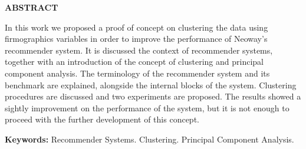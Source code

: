 \thispagestyle{plain}

\begin{center}
	\textbf{ABSTRACT}
\end{center}

\bigskip

In this work we proposed a proof of concept on clustering the data using firmographics variables in order to improve the performance of Neoway's recommender system. It is discussed the context of recommender systems, together with an introduction of the concept of clustering and principal component analysis. The terminology of the recommender system and its benchmark are explained, alongside the internal blocks of the system. Clustering procedures are discussed and two experiments are proposed. The results showed a sightly improvement on the performance of the system, but it is not enough to proceed with the further development of this concept.

\textbf{Keywords:} Recommender Systems. Clustering. Principal Component Analysis.